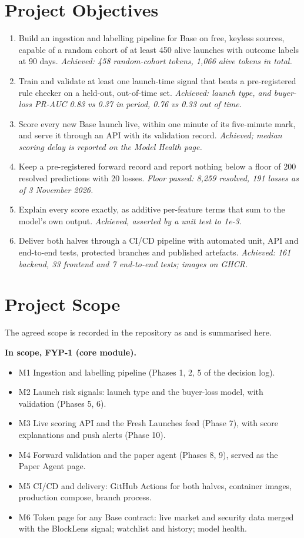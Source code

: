 \section{Project Objectives}
\begin{enumerate}[label=\textbf{O\arabic*}]
  \item Build an ingestion and labelling pipeline for Base on free, keyless sources, capable of a random cohort of at least 450 alive launches with outcome labels at 90 days. \emph{Achieved: 458 random-cohort tokens, 1,066 alive tokens in total.}
  \item Train and validate at least one launch-time signal that beats a pre-registered rule checker on a held-out, out-of-time set. \emph{Achieved: launch type, and buyer-loss PR-AUC 0.83 vs 0.37 in period, 0.76 vs 0.33 out of time.}
  \item Score every new Base launch live, within one minute of its five-minute mark, and serve it through an API with its validation record. \emph{Achieved; median scoring delay is reported on the Model Health page.}
  \item Keep a pre-registered forward record and report nothing below a floor of 200 resolved predictions with 20 losses. \emph{Floor passed: 8,259 resolved, 191 losses as of 3 November 2026.}
  \item Explain every score exactly, as additive per-feature terms that sum to the model's own output. \emph{Achieved, asserted by a unit test to 1e-3.}
  \item Deliver both halves through a CI/CD pipeline with automated unit, API and end-to-end tests, protected branches and published artefacts. \emph{Achieved: 161 backend, 33 frontend and 7 end-to-end tests; images on GHCR.}
\end{enumerate}

\section{Project Scope}
\label{sec:scope}
The agreed scope is recorded in the repository as  and is summarised here.

\textbf{In scope, FYP-1 (core module).}
\begin{itemize}
  \item M1 Ingestion and labelling pipeline (Phases 1, 2, 5 of the decision log).
  \item M2 Launch risk signals: launch type and the buyer-loss model, with validation (Phases 5, 6).
  \item M3 Live scoring API and the Fresh Launches feed (Phase 7), with score explanations and push alerts (Phase 10).
  \item M4 Forward validation and the paper agent (Phases 8, 9), served as the Paper Agent page.
  \item M5 CI/CD and delivery: GitHub Actions for both halves, container images, production compose, branch process.
  \item M6 Token page for any Base contract: live market and security data merged with the BlockLens signal; watchlist and history; model health.
\end{itemize}


